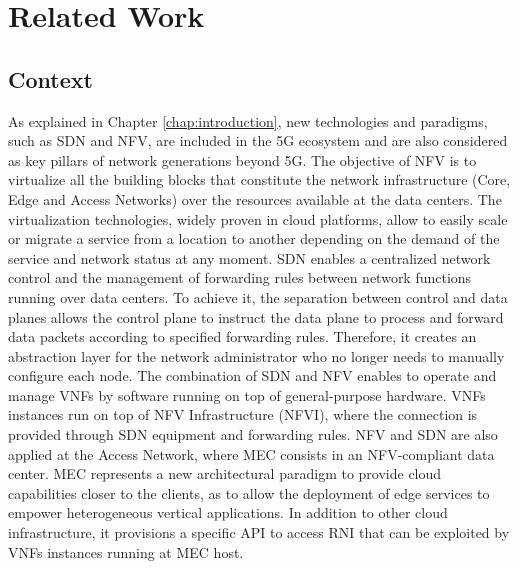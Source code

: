 \chapter{Related Work}
\label{chap:sota}

\section{Context}

As explained in Chapter \ref{chap:introduction}, new technologies and paradigms, such as SDN and NFV, are included in the 5G ecosystem and are also considered as key pillars of network generations beyond 5G.
The objective of NFV is to virtualize all the building blocks that constitute the network infrastructure (Core, Edge and Access Networks) over the resources available at the data centers.
The virtualization technologies, widely proven in cloud platforms, allow to easily scale or migrate a service from a location to another depending on the demand of the service and network status at any moment.
SDN enables a centralized network control and the management of forwarding rules between network functions running over data centers. To achieve it, the separation between control and data planes allows the control plane to instruct the data plane to process and forward data packets according to specified forwarding rules. Therefore, it creates an abstraction layer for the network administrator who no longer needs to manually configure each node.
The combination of SDN and NFV enables to operate and manage VNFs by software running on top of general-purpose hardware. VNFs instances run on top of NFV Infrastructure (NFVI), where the connection is provided through SDN equipment and forwarding rules.
NFV and SDN are also applied at the Access Network, where MEC consists in an NFV-compliant data center. MEC represents a new architectural paradigm to provide cloud capabilities closer to the clients, as to allow the deployment of edge services to empower heterogeneous vertical applications. In addition to other cloud infrastructure, it provisions a specific API to access RNI that can be exploited by VNFs instances running at MEC host.

